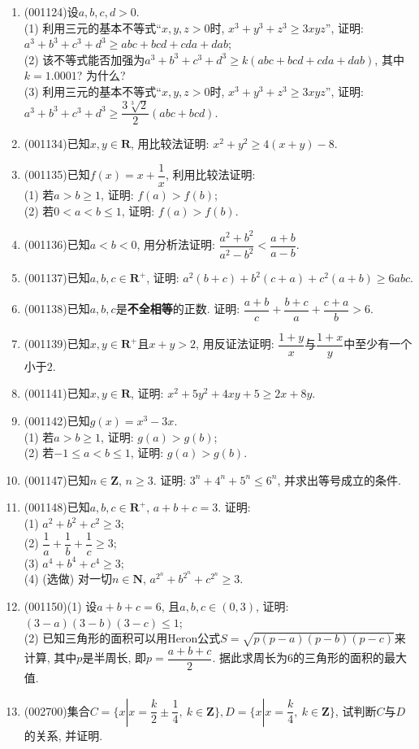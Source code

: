 \documentclass[10pt,a4paper]{article}
\begin{document}
\begin{enumerate}[1.]
\item {\tiny (001124)}设$a,b,c,d>0$.\\ 
(1) 利用三元的基本不等式``$x,y,z>0$时, $x^3+y^3+z^3\ge 3xyz$'', 证明: $a^3+b^3+c^3+d^3\geq abc+bcd+cda+dab$;\\ 
(2) 该不等式能否加强为$a^3+b^3+c^3+d^3\ge k(abc+bcd+cda+dab)$, 其中$k=1.0001$? 为什么?\\ 
(3) 利用三元的基本不等式``$x,y,z>0$时, $x^3+y^3+z^3\ge 3xyz$'', 证明: $a^3+b^3+c^3+d^3\geq \dfrac{3\sqrt[3]{2}}{2}(abc+bcd)$.
\item {\tiny (001134)}已知$x,y \in \mathbf{R}$, 用比较法证明: $x^2+y^2\ge 4(x+y)-8$.
\item {\tiny (001135)}已知$f(x)=x+\dfrac{1}{x}$, 利用比较法证明:\\ 
(1) 若$a>b\ge 1$, 证明: $f(a)>f(b)$;\\ 
(2) 若$0<a<b\le 1$, 证明: $f(a)>f(b)$.
\item {\tiny (001136)}已知$a<b<0$, 用分析法证明: $\dfrac{a^2+b^2}{a^2-b^2}<\dfrac{a+b}{a-b}$.
\item {\tiny (001137)}已知$a,b,c\in \mathbf{R}^+$, 证明: $a^2(b+c)+b^2(c+a)+c^2(a+b)\ge 6abc$.
\item {\tiny (001138)}已知$a,b,c$是{\bf 不全相等}的正数. 证明: $\dfrac{a+b}{c}+\dfrac{b+c}{a}+\dfrac{c+a}{b}>6$.
\item {\tiny (001139)}已知$x,y\in \mathbf{R}^+$且$x+y>2$, 用反证法证明: $\dfrac{1+y}{x}$与$\dfrac{1+x}{y}$中至少有一个小于$2$.
\item {\tiny (001141)}已知$x,y\in \mathbf{R}$, 证明: $x^2+5y^2+4xy+5\ge 2x+8y$.
\item {\tiny (001142)}已知$g(x)=x^3-3x$.\\ 
(1) 若$a>b\ge 1$, 证明: $g(a)>g(b)$;\\ 
(2) 若$-1\le a<b\le 1$, 证明: $g(a)>g(b)$.
\item {\tiny (001147)}已知$n\in\mathbf{Z}$, $n \ge 3$. 证明: $3^n+4^n+5^n\le 6^n$, 并求出等号成立的条件.
\item {\tiny (001148)}已知$a,b,c\in \mathbf{R}^+$, $a+b+c=3$. 证明:\\ 
(1) $a^2+b^2+c^2\ge 3$;\\ 
(2) $\dfrac1a+\dfrac1b+\dfrac1c\ge 3$;\\ 
(3) $a^4+b^4+c^4\ge 3$;\\ 
(4) (选做) 对一切$n\in \mathbf{N}$, $a^{2^n}+b^{2^n}+c^{2^n}\ge 3$.
\item {\tiny (001150)}(1) 设$a+b+c=6$, 且$a,b,c\in(0,3)$, 证明: $(3-a)(3-b)(3-c)\le 1$;\\ 
(2) 已知三角形的面积可以用Heron公式$S=\sqrt{p(p-a)(p-b)(p-c)}$来计算, 其中$p$是半周长, 即$p=\dfrac{a+b+c}{2}$. 据此求周长为$6$的三角形的面积的最大值.
\item {\tiny (002700)}集合$C=\{x|x=\dfrac k2\pm \dfrac14, \ k\in \mathbf{Z}\},D=\{x|x=\dfrac k4,\ k\in \mathbf{Z}\}$, 试判断$C$与$D$的关系, 并证明.


\end{enumerate}
\end{document}
